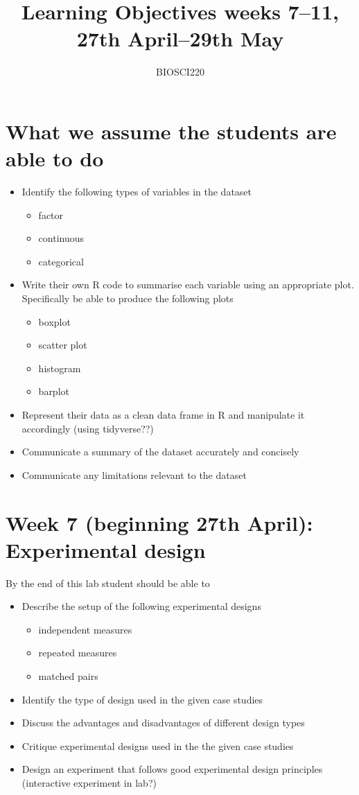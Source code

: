 \documentclass{article}
\begin{document}
\title{Learning Objectives weeks 7--11, 27th April--29th May}
\author{BIOSCI220}
\date{}
\maketitle


\section*{What we assume the students are able to do}
\begin{itemize}
\item Identify the following types of variables in the dataset
  \begin{itemize}
  \item factor
  \item continuous
  \item categorical
  \end{itemize}
\item Write their own R code to summarise each variable using an appropriate plot. Specifically be able to produce the following plots
  \begin{itemize}
  \item boxplot
  \item scatter plot
  \item histogram
  \item barplot
  \end{itemize}
\item Represent their data as a clean data frame in R and manipulate it accordingly (using tidyverse??)
\item Communicate a summary of the dataset accurately and concisely
\item Communicate any limitations relevant to the dataset
\end{itemize}


\section*{Week 7 (beginning 27th April):  Experimental design}
By the end of this lab student should be able to
\begin{itemize}
\item Describe the setup of the following experimental designs
  \begin{itemize}
  \item independent measures
  \item repeated measures
    \item matched pairs
  \end{itemize}
\item Identify the type of design used in the given case studies
  \item Discuss the advantages and disadvantages of different design types
\item Critique experimental designs used in the the given case studies
\item Design an experiment that follows good experimental design principles (interactive experiment in lab?)
\end{itemize}
\end{document}
